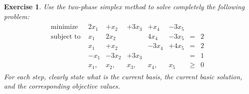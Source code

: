 \documentclass[12pt]{article}
\theoremstyle{colon}
\newtheorem{exercise}{Exercise}
\begin{document}
\clearpage

\begin{exercise}
  Use the two-phase simplex method to solve completely the following problem:
  \begin{gather*}
    \begin{matrix}
      \text{minimize } &2x_1 &+x_2 &+3x_3 &+x_4 &-3x_5 & & \\
      \text{subject to } &x_1 &2x_2 & &4x_4 &-3x_5 &= &2 \\
      &x_1 &+x_2 & &-3x_4 &+4x_5 &= &2 \\
      &-x_1 &-3x_2 &+3x_3 & & &= &1 \\
      &x_1, &x_2, &x_3, &x_4, &x_5 &\geq &0
    \end{matrix}
  \end{gather*}
  For each step, clearly state what is the current basis, the current basic solution, and the corresponding objective values.
\end{exercise}
\end{document}
